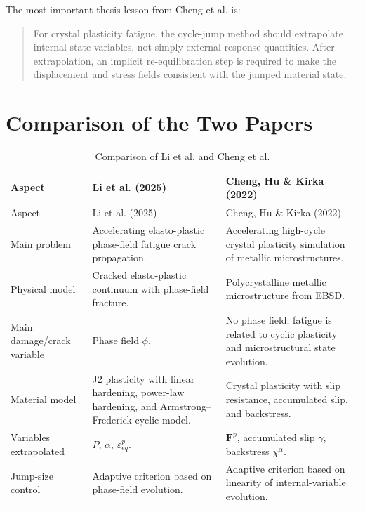 \documentclass[11pt,a4paper]{article}
\begin{document}
The most important thesis lesson from Cheng et al. is:

\begin{quote}
For crystal plasticity fatigue, the cycle-jump method should extrapolate internal state variables, not simply external response quantities. After extrapolation, an implicit re-equilibration step is required to make the displacement and stress fields consistent with the jumped material state.
\end{quote}

\newpage
\section{Comparison of the Two Papers}

\begin{longtable}{p{}p{}p{}}
\caption{Comparison of Li et al. and Cheng et al.} \\
\toprule
Aspect & Li et al. (2025) & Cheng, Hu \& Kirka (2022) \\
\midrule
\endfirsthead
\toprule
Aspect & Li et al. (2025) & Cheng, Hu \& Kirka (2022) \\
\midrule
\endhead

Main problem &
Accelerating elasto-plastic phase-field fatigue crack propagation. &
Accelerating high-cycle crystal plasticity simulation of metallic microstructures. \\

Physical model &
Cracked elasto-plastic continuum with phase-field fracture. &
Polycrystalline metallic microstructure from EBSD. \\

Main damage/crack variable &
Phase field $\phi$. &
No phase field; fatigue is related to cyclic plasticity and microstructural state evolution. \\

Material model &
J2 plasticity with linear hardening, power-law hardening, and Armstrong--Frederick cyclic model. &
Crystal plasticity with slip resistance, accumulated slip, and backstress. \\

Variables extrapolated &
$P$, $\alpha$, $\varepsilon_{eq}^p$. &
$\bm{F}^p$, accumulated slip $\gamma$, backstress $\chi^{\alpha}$. \\

Jump-size control &
Adaptive criterion based on phase-field evolution. &
Adaptive criterion based on linearity of internal-variable evolution. \\


\end{longtable}
\end{document}

